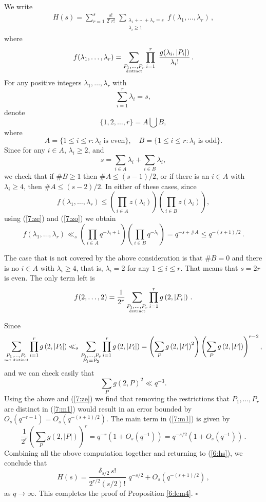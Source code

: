 \documentclass[12pt]{amsart}
\theoremstyle{plain}
\begin{document}
We write
\begin{eqnarray} \label{6:hs} H(s)=\sum_{r=1}^s\frac{s!}{2^r r!}\,\, \sum_{\substack{\lambda_1+\cdots+\lambda_r=s\\ \lambda_i \ge 1}} f(\lambda_1,\ldots,\lambda_r)\,, \end{eqnarray}
where \begin{eqnarray*} f(\lambda_1,\ldots,\lambda_r)= \sum_{\substack{P_1,\ldots,P_r\\ \mbox{\tiny distinct}}} \prod_{i=1}^r\,\,\frac{g(\lambda_i,|P_i|)}{\lambda_i!} \,.\end{eqnarray*}
For any positive integers $\lambda_1,\ldots,\lambda_r$ with
\[\sum_{i=1}^r \lambda_i=s,\]
denote
\[\{1,2,\ldots,r\}=A \bigcup B,\]
where
\[A=\{1 \le i \le r: \lambda_i \mbox{ is even}\},\quad B=\{1 \le i \le r: \lambda_i \mbox{ is odd}\}.\]
Since for any $i \in A$, $\lambda_i \ge 2$, and
\[s=\sum_{i \in A} \lambda_i+\sum_{i \in B} \lambda_i,\]
we check that if $\#B \ge 1$ then $\#A \le (s-1)/2$, or if there is an $i \in A$ with $\lambda_i \ge 4$, then $\#A \le (s-2)/2$. In either of these cases, since
\[f(\lambda_1,\ldots,\lambda_r) \le \left(\prod_{i \in A} z(\lambda_i)\right) \left(\prod_{i \in B} z(\lambda_i)\right), \]
using (\ref{7:ze}) and (\ref{7:zo}) we obtain
\[f(\lambda_1,\ldots,\lambda_r) \ll_s \left(\prod_{i \in A}q^{-\lambda_i+1}\right) \left(\prod_{i \in B} q^{-\lambda_i}\right)=q^{-s+\#A} \le q^{-(s+1)/2}\,.\]

The case that is not covered by the above consideration is that $\#B=0$ and there is no $i \in A$ with $\lambda_i \ge 4$, that is, $\lambda_i=2$ for any $1 \le i \le r$. That means that $s=2r$ is even. The only term left is
\begin{eqnarray} \label{7:m1} f(2,\ldots,2)=\frac{1}{2^r} \sum_{\substack{P_1,\ldots,P_r\\ \mbox{\tiny distinct}} } \prod_{i=1}^r g\left(2,|P_i|\right)\,.\end{eqnarray}

Since
\[\sum_{\substack{P_1,\ldots,P_r\\ \mbox{\tiny not distinct}} } \prod_{i=1}^r g\left(2,|P_i|\right) \ll_s \sum_{\substack{P_1,\ldots,P_r\\ P_1=P_2} } \prod_{i=1}^r g\left(2,|P_i|\right)=\left(\sum_{P}g\left(2,|P|\right)^2\right)
\left(\sum_{P}g\left(2,|P|\right)\right)^{r-2},\]
and we can check easily that
\[\sum_{P}g\left(2,P\right)^2 \ll q^{-3}.\]
Using the above and (\ref{7:ze}) we find that removing the restrictions that $P_1,\ldots,P_r$ are distinct in (\ref{7:m1}) would result in an error bounded by $O_s\left(q^{-r-1}\right)=O_s\left(q^{-(s+1)/2}\right)$. The main term in (\ref{7:m1}) is given by
\[\frac{1}{2^r}\left(\sum_{P}g\left(2,|P|\right)\right)^{r}
=q^{-r}\left(1+O_s(q^{-1})\right)=q^{-s/2}\left(1+O_s(q^{-1})\right)\,.\]
Combining all the above computation together and returning to (\ref{6:hs}), we conclude that
\[H(s) = \frac{\delta_{s/2}\, s!}{2^{r/2} (s/2)!} \,\, q^{-s/2}+O_s\left(q^{-(s+1)/2}\right)\,,\]
as $q \to \infty$. This completes the proof of Proposition \ref{6:lem4}. \quad $\square$
\end{document}
